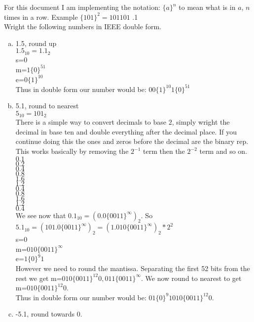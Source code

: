 \documentclass[12pt]{article}
\makeatletter
\theoremstyle{homework}
\newenvironment{exercise}[1]
{\def\@currentlabel{#1}\exercisecore}
{\endexercisecore}
\makeatother
\begin{document}
For this document I am implementing the notation: $\{a\}^n$ to mean what is in $a$, $n$ times in a row.  Example $\{101\}^2=101101$
\begin{exercise}

5.1\\
Wright the following numbers in IEEE double form.
\end{exercise}
\begin{enumerate}[(a)]
\item
1.5, round up\\
$1.5_{10}=1.1_2$\\
s=$0$\\
m=$1\{0\}^{51}$\\
e=$0\{1\}^{10}$\\
Thus in double form our number would be: $00\{1\}^{10}1\{0\}^{51}$
\item
5.1, round to nearest\\
$5_{10}=101_2$\\
There is a simple way to convert decimals to base $2$, simply wright the decimal in base ten and double everything after the decimal place.  If you continue doing this the ones and zeros before the decimal are the binary rep.  This works basically by removing the $2^{-1}$ term then the $2^{-2}$ term and so on.\\
$0.1$\\
$0.2$\\
$0.4$\\
$0.8$\\
$1.6$\\
$1.2$\\
$0.4$\\
$0.8$\\
$1.6$\\
$1.2$\\
$0.4$\\
We see now that $0.1_{10}=(0.0\{0011\}^\infty)_2$.  So $5.1_{10}=(101.0\{0011\}^\infty)_2=(1.010\{0011\}^\infty)_2*2^2$\\
s=$0$\\
m=$010\{0011\}^\infty$\\
e=$1\{0\}^9 1$\\
However we need to round the mantissa.  Separating the first 52 bits from the rest we get m=$010\{0011\}^{12}0,011\{0011\}^\infty$.  We now round to nearest to get m=$010\{0011\}^{12}0$.\\
Thus in double form our number would be: $01\{0\}^9 1010\{0011\}^{12}0$.
\item
-5.1, round towards 0.\\

\end{enumerate}
\end{document}
